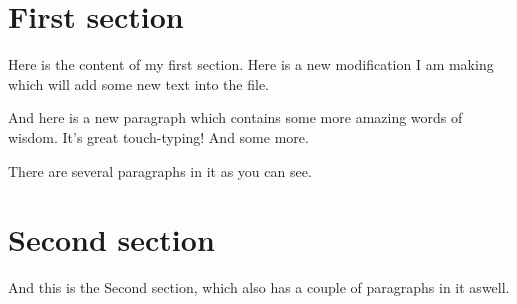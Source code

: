 \documentclass[12pt, a4paper, oneside, openright]{article}
\begin{document}
\section{First section}

Here is the content of my first section. Here is a new modification I am making which will add some new text into the file.

And here is a new paragraph which contains some more amazing words of wisdom. It's great touch-typing! And some more.

There are several paragraphs in it as you can see.

\section{Second section}

And this is the Second section, which also has a couple of paragraphs in it aswell.
\end{document}
